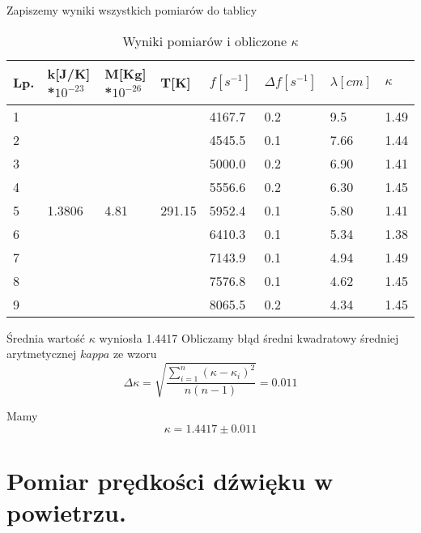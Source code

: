 \documentclass[12pt,a4paper]{article}
\begin{document}
Zapiszemy wyniki wszystkich pomiarów do tablicy

\begin{table}[H]
\centering

\label{my-label}
\begin{tabular}{|l|l|l|l|l|l|l|l|}
\hline
Lp. & k{[}J/K{]} *$10^{-23}$       & M{[}Kg{]} *$10^{-26}$      & T{[}K{]}                & $f[s^{-1}]$ & $\Delta f[s^{-1}]$ & $\lambda[cm]$ & $\kappa$ \\ \hline
1   & \multirow{9}{*}{1.3806} & \multirow{9}{*}{4.81} & \multirow{9}{*}{291.15} & 4167.7     & 0.2         & 9.5           & 1.49  \\ \cline{1-1} \cline{5-8} 
2   &                         &                       &                         & 4545.5     & 0.1         & 7.66           & 1.44  \\ \cline{1-1} \cline{5-8} 
3   &                         &                       &                         & 5000.0     & 0.2         & 6.90           & 1.41  \\ \cline{1-1} \cline{5-8} 
4   &                         &                       &                         & 5556.6     & 0.2         & 6.30           & 1.45  \\ \cline{1-1} \cline{5-8} 
5   &                         &                       &                         & 5952.4     & 0.1         & 5.80          & 1.41  \\ \cline{1-1} \cline{5-8} 
6   &                         &                       &                         & 6410.3     & 0.1         & 5.34          & 1.38  \\ \cline{1-1} \cline{5-8} 
7   &                         &                       &                         & 7143.9     & 0.1         & 4.94          & 1.49  \\ \cline{1-1} \cline{5-8} 
8   &                         &                       &                         & 7576.8     & 0.1         & 4.62           & 1.45  \\ \cline{1-1} \cline{5-8} 
9   &                         &                       &                         & 8065.5     & 0.2         & 4.34           & 1.45  \\ \hline
\end{tabular}
\caption{Wyniki pomiarów i obliczone $\kappa$}
\end{table}
Średnia wartość $\kappa$ wyniosła 1.4417
Obliczamy błąd średni kwadratowy średniej arytmetycznej $kappa$ ze wzoru
$$
\Delta \kappa = \sqrt{\frac{\sum\limits_{i=1}^{n}{(\kappa-\kappa_i)^2}}{n(n-1)}} =  0.011
$$

Mamy 
$$
\kappa = 1.4417 \pm 0.011
$$

\section{Pomiar prędkości dźwięku w powietrzu.}
\end{document}
